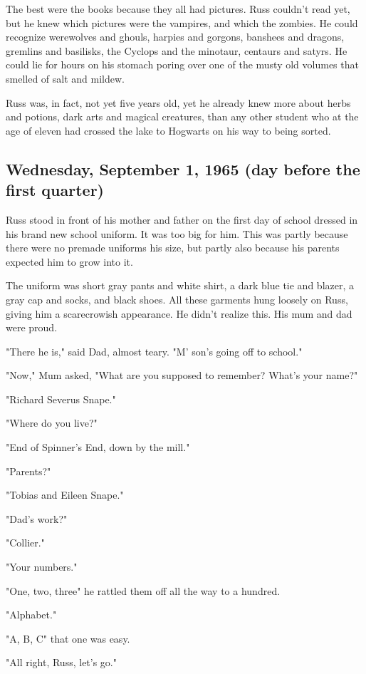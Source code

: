 The best were the books because they all had pictures. Russ couldn't read yet, but he knew which pictures were the vampires, and which the zombies. He could recognize werewolves and ghouls, harpies and gorgons, banshees and dragons, gremlins and basilisks, the Cyclops and the minotaur, centaurs and satyrs. He could lie for hours on his stomach poring over one of the musty old volumes that smelled of salt and mildew.

Russ was, in fact, not yet five years old, yet he already knew more about herbs and potions, dark arts and magical creatures, than any other student who at the age of eleven had crossed the lake to Hogwarts on his way to being sorted.

\subsection{Wednesday, September 1, 1965 (day before the first quarter)}

Russ stood in front of his mother and father on the first day of school dressed in his brand new school uniform. It was too big for him. This was partly because there were no premade uniforms his size, but partly also because his parents expected him to grow into it.

The uniform was short gray pants and white shirt, a dark blue tie and blazer, a gray cap and socks, and black shoes. All these garments hung loosely on Russ, giving him a scarecrowish appearance. He didn't realize this. His mum and dad were proud.

"There he is," said Dad, almost teary. "M' son's going off to school."

"Now," Mum asked, "What are you supposed to remember? What's your name?"

"Richard Severus Snape."

"Where do you live?"

"End of Spinner's End, down by the mill."

"Parents?"

"Tobias and Eileen Snape."

"Dad's work?"

"Collier."

"Your numbers."

"One, two, three{\el}" he rattled them off all the way to a hundred.

"Alphabet."

"A, B, C{\el}" that one was easy.

"All right, Russ, let's go."

